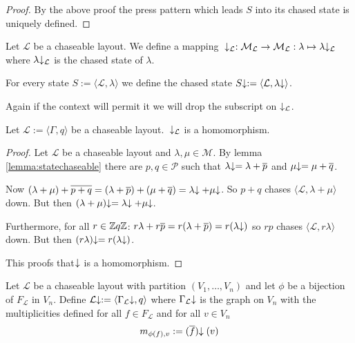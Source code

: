 \begin{proof}
	By the above proof the press pattern which leads $S$ into its chased
	state is uniquely defined.
\end{proof}

\begin{definition}
	Let $\mathcal{L}$ be a chaseable layout. We define a mapping\mbox{ }
	$\negthickspace\downarrow_{\mathcal{L}} : \mathcal{M}_{\mathcal{L}} \rightarrow
	\mathcal{M}_{\mathcal{L}} : \lambda \mapsto \lambda\negthickspace\downarrow_\mathcal{L}$
	where $\lambda\negthickspace\downarrow_\mathcal{L}$ is the chased state of $\lambda$.
	
	For every state $S := \langle\mathcal{L},\lambda\rangle$ we define the
	chased state $S\negthickspace\downarrow := \langle\mathcal{L},\lambda\negthickspace\downarrow\rangle$.
\end{definition}

\begin{remark}
	Again if the context will permit it we will drop the subscript on
	$\thickspace\negthickspace\downarrow_{\mathcal{L}}$.
\end{remark}

\begin{lemma}\label{lemma:homomorphism}
	Let $\mathcal{L}:=\langle \Gamma, q \rangle$ be a chaseable layout. \
	$\negthickspace\downarrow_{\mathcal{L}}$ is a homomorphism. 
\end{lemma}

\begin{proof}
	Let $\mathcal{L}$ be a chaseable layout and $\lambda,\mu \in
	\mathcal{M}$. By lemma \ref{lemma:statechaseable} there are $p,q \in
	\mathcal{P}$ such that $\lambda\negthickspace\downarrow = \lambda + \overline{p}$ and
	$\mu\negthickspace\downarrow = \mu + \overline{q}$.
	
	Now $(\lambda+\mu) + \overline{p+q} = (\lambda + \overline{p}) + (\mu +
	\overline{q}) = \lambda\negthickspace\downarrow + \mu\negthickspace\downarrow$. So $p+q$ chases
	$\langle\mathcal{L},\lambda+\mu\rangle$ down. But then
	$(\lambda+\mu)\negthickspace\downarrow = \lambda\negthickspace\downarrow + \mu\negthickspace\downarrow$.
	
	Furthermore, for all $r\in\mathbb{Z}\/q\mathbb{Z}$: $r\lambda + r\overline{p} =
	r(\lambda + \overline{p}) = r(\lambda\negthickspace\downarrow)$ so $rp$ chases
	$\langle\mathcal{L},r\lambda\rangle$ down. But then $(r\lambda)\negthickspace\downarrow =
	r(\lambda\negthickspace\downarrow)$. 
	
	This proofs that $\negthickspace\downarrow$ is a homomorphism.
\end{proof}

\begin{definition}
	Let $\mathcal{L}$ be a chaseable layout with partition
	$(V_{1},\ldots,V_{n})$ and let $\phi$ be a bijection of
	$F_{\mathcal{L}}$ in $V_{n}$. Define $\mathcal{L}\negthickspace\downarrow := \langle
	\Gamma_{\mathcal{L}}\negthickspace\downarrow,q\rangle$ where $\Gamma_{\mathcal{L}}\negthickspace\downarrow$ is
	the graph on $V_{n}$ with the multiplicities defined for all $f \in
	F_{\mathcal{L}}$ and for all $v\in V_{n}$
	\[
		m_{\phi(f),v} := (\overline{f})\negthickspace\downarrow(v)
	\]
\end{definition}

